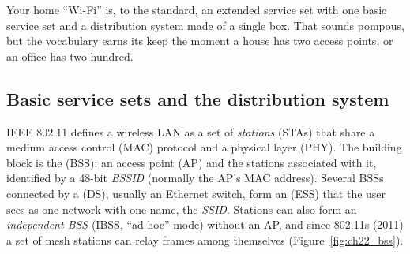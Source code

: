 Your home ``Wi-Fi'' is, to the standard, an extended service set with one basic service set and a
distribution system made of a single box. That sounds pompous, but the vocabulary earns its keep
the moment a house has two access points, or an office has two hundred.

\subsection{Basic service sets and the distribution system}

IEEE 802.11 defines a wireless LAN as a set of \emph{stations} (STAs) that share a medium access
control (MAC) protocol and a physical layer (PHY). The building block is the  (BSS): an access point (AP) and the stations associated with it, identified by a 48-bit
\emph{BSSID} (normally the AP's MAC address). Several BSSs connected by a 
(DS), usually an Ethernet switch, form an  (ESS) that the user sees as
one network with one name, the \emph{SSID}. Stations can also form an \emph{independent BSS} (IBSS,
``ad hoc'' mode) without an AP, and since 802.11s (2011) a set of mesh stations can relay frames
among themselves (Figure~\ref{fig:ch22_bss}).


